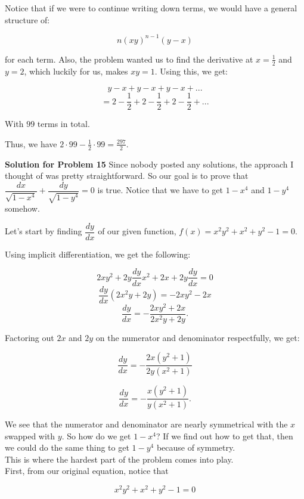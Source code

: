 \documentclass{article}
\begin{document}
Notice that if we were to continue writing down terms, we would have a general structure of:

\[n\left(xy\right)^{n - 1}\left( y - x \right)\]

for each term. Also, the problem wanted us to find the derivative at $x = \frac {1} {2}$ and $y = 2$, which luckily for us, makes $xy = 1$. Using this, we get:

\[y - x + y - x + y - x + ...\]
\[= 2 - \frac {1} {2} + 2 - \frac {1} {2} + 2 - \frac {1} {2} + ...\]

With $99$ terms in total.

Thus, we have $2 \cdot 99 - \frac {1} {2} \cdot 99 = \boxed{\frac {297} {2}}.$

\vspace{1cm}


\textbf{Solution for Problem 15} Since nobody posted any solutions, the approach I thought of was pretty straightforward. So our goal is to prove that $\dfrac {dx} {\sqrt{1 - x^4}} + \dfrac {dy} {\sqrt{1 - y^4}} = 0$ is true. Notice that we have to get $1 - x^4$ and $1 - y^4$ somehow.

Let's start by finding $\dfrac {dy} {dx}$ of our given function, $f(x) = x^{2}y^{2} + x^{2} + y^{2} - 1 = 0.$

Using implicit differentiation, we get the following:

\[ 2xy^{2} + 2y\frac {dy} {dx}x^{2} + 2x + 2y\frac {dy} {dx} = 0 \]
\[ \frac {dy} {dx} \left( 2x^{2}y + 2y \right) = -2xy^{2} - 2x \]
\[ \dfrac {dy} {dx} = -\dfrac {2xy^{2} + 2x} {2x^{2}y + 2y}. \]

Factoring out $2x$ and $2y$ on the numerator and denominator respectfully, we get:

\[ \dfrac {dy} {dx} = -\dfrac {2x \left( y^{2} + 1 \right)} {2y \left( x^{2} + 1 \right)} \]

\[ \dfrac {dy} {dx} = -\dfrac {x \left( y^{2} + 1 \right)} {y \left( x^{2} + 1 \right)}. \]

We see that the numerator and denominator are nearly symmetrical with the $x$ swapped with $y$. So how do we get $1 - x^4$? If we find out how to get that, then we could do the same thing to get $1 - y^4$ because of symmetry.\\

This is where the hardest part of the problem comes into play.\\
First, from our original equation, notice that

\[x^{2}y^{2} + x^{2} + y^{2} - 1 = 0\]
\end{document}
